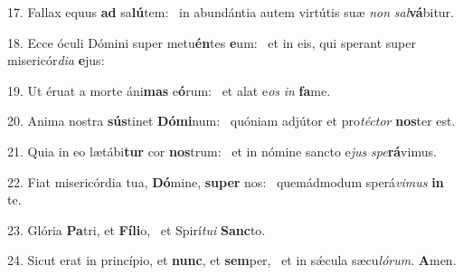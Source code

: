 17. Fallax equus \textbf{ad} sa\textbf{lú}tem: \ast\  in abundántia autem virtútis suæ \textit{non} \textit{sal}\textbf{vá}bitur.\

18. Ecce óculi Dómini super metu\textbf{én}tes \textbf{e}um: \ast\  et in eis, qui sperant super misericór\textit{di}\textit{a} \textbf{e}jus:\

19. Ut éruat a morte áni\textbf{mas} e\textbf{ó}rum: \ast\  et alat e\textit{os} \textit{in} \textbf{fa}me.\

20. Anima nostra \textbf{sús}tinet \textbf{Dó}\textbf{mi}num: \ast\  quóniam adjútor et pro\textit{téc}\textit{tor} \textbf{nos}ter est.\

21. Quia in eo lætábi\textbf{tur} cor \textbf{nos}trum: \ast\  et in nómine sancto e\textit{jus} \textit{spe}\textbf{rá}vimus.\

22. Fiat misericórdia tua, \textbf{Dó}mine, \textbf{su}\textbf{per} nos: \ast\  quemádmodum sperá\textit{vi}\textit{mus} \textbf{in} te.\

23. Glória \textbf{Pa}tri, et \textbf{Fí}\textbf{li}o, \ast\  et Spirí\textit{tu}\textit{i} \textbf{Sanc}to.\

24. Sicut erat in princípio, et \textbf{nunc}, et \textbf{sem}per, \ast\  et in sǽcula sæcu\textit{ló}\textit{rum}. \textbf{A}men.\

